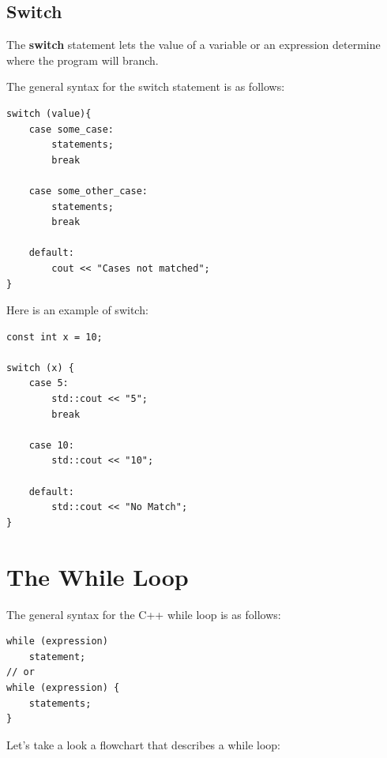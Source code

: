 \documentclass{report}
\begin{document}
    \subsection{Switch}
    \bigbreak \noindent 
    \begin{concept}
 The \textbf{switch} statement lets the value of a variable or an expression determine where the program will branch.
	\end{concept}
    \bigbreak \noindent 
    The general syntax for the switch statement is as follows:
    \bigbreak \noindent 
    \sepline
    \begin{verbatim}
switch (value){
    case some_case:
        statements;
        break

    case some_other_case:
        statements;
        break

    default:
        cout << "Cases not matched";
}
    \end{verbatim}
    \sepline
    \bigbreak \noindent 
    \bigbreak \noindent 
    Here is an example of switch:
    \bigbreak \noindent 
    \sepline
    \begin{verbatim}
const int x = 10;

switch (x) {
    case 5:
        std::cout << "5";
        break

    case 10:
        std::cout << "10";

    default:
        std::cout << "No Match";
}
    \end{verbatim}
    \sepline
    \bigbreak \noindent 

    \pagebreak \bigbreak \noindent 
    \section{\LARGE The While Loop}
    \bigbreak \noindent 
    The general syntax for the C++ while loop is as follows:
    \bigbreak \noindent 
    \sepline
    \begin{verbatim}
while (expression)
    statement;
// or
while (expression) {
    statements;
}
    \end{verbatim}
    \sepline
    \bigbreak \noindent 
    \begin{minipage}[]{0.47\textwidth}
        Let's take a look a flowchart that describes a while loop:
    \end{minipage}
    \begin{minipage}[]{0.47\textwidth}
    \end{minipage}
    \bigbreak \noindent 
\end{document}
